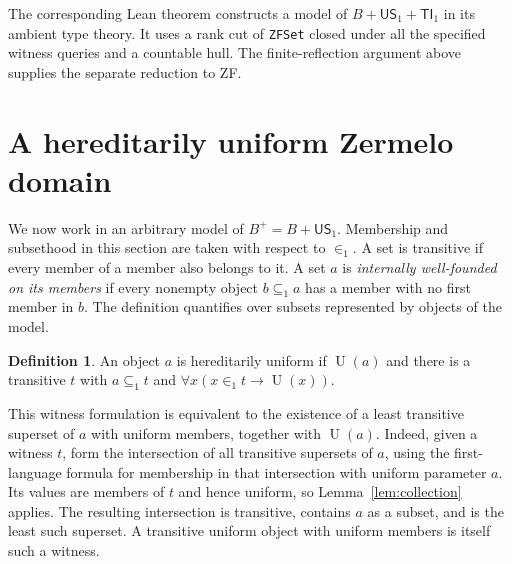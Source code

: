 \documentclass[11pt,a4paper]{article}
\numberwithin{equation}{section}
\theoremstyle{definition}
\newtheorem{definition}[theorem]{Definition}
\theoremstyle{remark}
\newcommand{\TI}{\mathsf{TI}_1}
\newcommand{\US}{\mathsf{US}_1}
\newcommand{\Unif}{\operatorname{U}}
\newcommand{\subone}{\subseteq_1}
\newcommand{\extone}{\in_1}
\newcommand{\code}[1]{\nolinkurl{#1}}
\begin{document}
The corresponding Lean theorem constructs a model of $B+\US+\TI$ in its ambient type theory. It uses a rank cut of \code{ZFSet} closed under all the specified witness queries and a countable hull. The finite-reflection argument above supplies the separate reduction to ZF.

\section{A hereditarily uniform Zermelo domain}\label{sec:zermelo}
We now work in an arbitrary model of $B^+=B+\US$. Membership and subsethood in this section are taken with respect to $\extone$. A set is transitive if every member of a member also belongs to it. A set $a$ is \emph{internally well-founded on its members} if every nonempty object $b\subone a$ has a member with no first member in $b$. The definition quantifies over subsets represented by objects of the model.

\begin{definition}\label{def:hered}
An object $a$ is hereditarily uniform if $\Unif(a)$ and there is a transitive $t$ with $a\subone t$ and $\forall x(x\extone t\to\Unif(x))$.
\end{definition}
This witness formulation is equivalent to the existence of a least transitive superset of $a$ with uniform members, together with $\Unif(a)$. Indeed, given a witness $t$, form the intersection of all transitive supersets of $a$, using the first-language formula for membership in that intersection with uniform parameter $a$. Its values are members of $t$ and hence uniform, so Lemma~\ref{lem:collection} applies. The resulting intersection is transitive, contains $a$ as a subset, and is the least such superset. A transitive uniform object with uniform members is itself such a witness.
\end{document}
